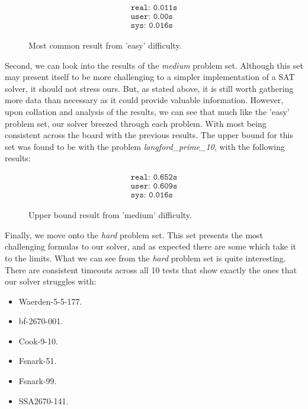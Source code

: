 \documentclass{article}
\begin{document}
\begin{figure}[h]
    \centering
    \begin{align*}
        \texttt{real: 0.011s} \\
        \texttt{user: 0.00s} \\
        \texttt{sys: 0.016s}
    \end{align*}
    \caption{Most common result from 'easy' difficulty.}
\end{figure}

Second, we can look into the results of the \textit{medium} problem set. Although this set may present itself to be more
challenging to a simpler implementation of a SAT solver, it should not stress ours. But, as stated above, it is still worth
gathering more data than necessary as it could provide valuable information. However, upon collation and analysis of the results,
we can see that much like the 'easy' problem set, our solver breezed through each problem. With most being consistent across the
board with the previous results. The upper bound for this set was found to be with the problem \textit{langford\_prime\_10}, with
the following results:

\begin{figure}[h]
    \centering
    \begin{align*}
        \texttt{real: 0.652s} \\
        \texttt{user: 0.609s} \\
        \texttt{sys: 0.016s}
    \end{align*}
    \caption{Upper bound result from 'medium' difficulty.}
\end{figure}

Finally, we move onto the \textit{hard} problem set. This set presents the most challenging formulas to our solver, and as
expected there are some which take it to the limits. What we can see from the \textit{hard} problem set is quite interesting.
There are consistent timeouts across all 10 tests that show exactly the ones that our solver struggles with:

\begin{itemize}
    \item Waerden-5-5-177.
    \item bf-2670-001.
    \item Cook-9-10.
    \item Fsnark-51.
    \item Fsnark-99.
    \item SSA2670-141.
\end{itemize}
\end{document}
